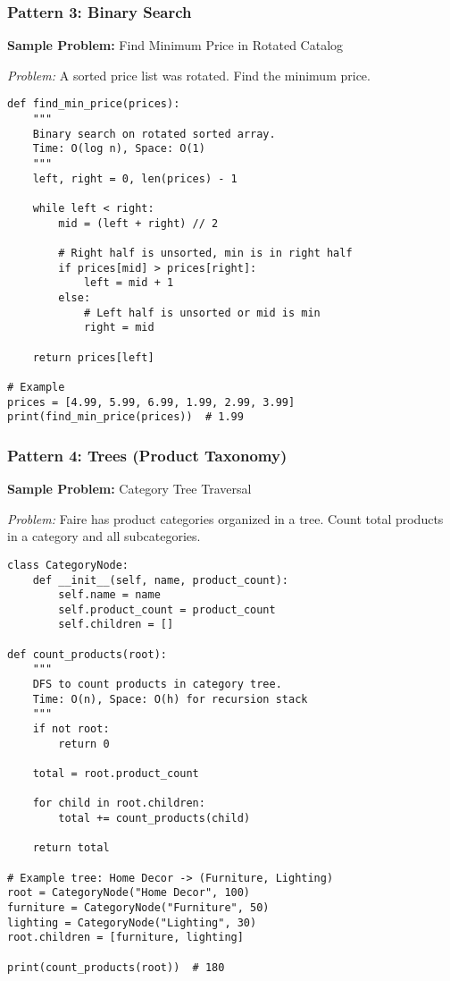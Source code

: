 \documentclass[11pt,letterpaper]{article}
\begin{document}
\subsubsection{Pattern 3: Binary Search}

\textbf{Sample Problem:} Find Minimum Price in Rotated Catalog

\textit{Problem:} A sorted price list was rotated. Find the minimum price.

\begin{lstlisting}
def find_min_price(prices):
    """
    Binary search on rotated sorted array.
    Time: O(log n), Space: O(1)
    """
    left, right = 0, len(prices) - 1

    while left < right:
        mid = (left + right) // 2

        # Right half is unsorted, min is in right half
        if prices[mid] > prices[right]:
            left = mid + 1
        else:
            # Left half is unsorted or mid is min
            right = mid

    return prices[left]

# Example
prices = [4.99, 5.99, 6.99, 1.99, 2.99, 3.99]
print(find_min_price(prices))  # 1.99
\end{lstlisting}

\subsubsection{Pattern 4: Trees (Product Taxonomy)}

\textbf{Sample Problem:} Category Tree Traversal

\textit{Problem:} Faire has product categories organized in a tree. Count total products in a category and all subcategories.

\begin{lstlisting}
class CategoryNode:
    def __init__(self, name, product_count):
        self.name = name
        self.product_count = product_count
        self.children = []

def count_products(root):
    """
    DFS to count products in category tree.
    Time: O(n), Space: O(h) for recursion stack
    """
    if not root:
        return 0

    total = root.product_count

    for child in root.children:
        total += count_products(child)

    return total

# Example tree: Home Decor -> (Furniture, Lighting)
root = CategoryNode("Home Decor", 100)
furniture = CategoryNode("Furniture", 50)
lighting = CategoryNode("Lighting", 30)
root.children = [furniture, lighting]

print(count_products(root))  # 180
\end{lstlisting}
\end{document}
